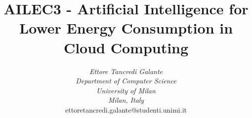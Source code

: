 \documentclass{article}
\begin{document}
\title{AILEC3 - Artificial Intelligence for Lower Energy Consumption in Cloud Computing}

\author{
\textit{Ettore Tancredi Galante} \\
\textit{Department of Computer Science} \\
\textit{University of Milan} \\
\textit{Milan, Italy} \\
ettoretancredi.galante@studenti.unimi.it
}


\maketitle
\newpage
\tableofcontents
\newpage











%
%
%



\end{document}
